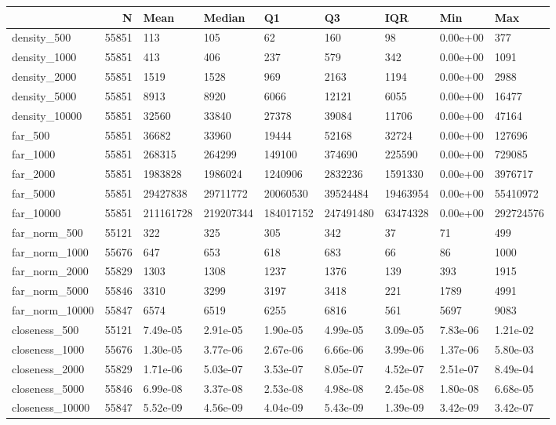 \begin{tabular}{lrlllllll}
\toprule
 & N & Mean & Median & Q1 & Q3 & IQR & Min & Max \\
\midrule
density\_500 & 55851 & 113 & 105 & 62 & 160 & 98 & 0.00e+00 & 377 \\
density\_1000 & 55851 & 413 & 406 & 237 & 579 & 342 & 0.00e+00 & 1091 \\
density\_2000 & 55851 & 1519 & 1528 & 969 & 2163 & 1194 & 0.00e+00 & 2988 \\
density\_5000 & 55851 & 8913 & 8920 & 6066 & 12121 & 6055 & 0.00e+00 & 16477 \\
density\_10000 & 55851 & 32560 & 33840 & 27378 & 39084 & 11706 & 0.00e+00 & 47164 \\
far\_500 & 55851 & 36682 & 33960 & 19444 & 52168 & 32724 & 0.00e+00 & 127696 \\
far\_1000 & 55851 & 268315 & 264299 & 149100 & 374690 & 225590 & 0.00e+00 & 729085 \\
far\_2000 & 55851 & 1983828 & 1986024 & 1240906 & 2832236 & 1591330 & 0.00e+00 & 3976717 \\
far\_5000 & 55851 & 29427838 & 29711772 & 20060530 & 39524484 & 19463954 & 0.00e+00 & 55410972 \\
far\_10000 & 55851 & 211161728 & 219207344 & 184017152 & 247491480 & 63474328 & 0.00e+00 & 292724576 \\
far\_norm\_500 & 55121 & 322 & 325 & 305 & 342 & 37 & 71 & 499 \\
far\_norm\_1000 & 55676 & 647 & 653 & 618 & 683 & 66 & 86 & 1000 \\
far\_norm\_2000 & 55829 & 1303 & 1308 & 1237 & 1376 & 139 & 393 & 1915 \\
far\_norm\_5000 & 55846 & 3310 & 3299 & 3197 & 3418 & 221 & 1789 & 4991 \\
far\_norm\_10000 & 55847 & 6574 & 6519 & 6255 & 6816 & 561 & 5697 & 9083 \\
closeness\_500 & 55121 & 7.49e-05 & 2.91e-05 & 1.90e-05 & 4.99e-05 & 3.09e-05 & 7.83e-06 & 1.21e-02 \\
closeness\_1000 & 55676 & 1.30e-05 & 3.77e-06 & 2.67e-06 & 6.66e-06 & 3.99e-06 & 1.37e-06 & 5.80e-03 \\
closeness\_2000 & 55829 & 1.71e-06 & 5.03e-07 & 3.53e-07 & 8.05e-07 & 4.52e-07 & 2.51e-07 & 8.49e-04 \\
closeness\_5000 & 55846 & 6.99e-08 & 3.37e-08 & 2.53e-08 & 4.98e-08 & 2.45e-08 & 1.80e-08 & 6.68e-05 \\
closeness\_10000 & 55847 & 5.52e-09 & 4.56e-09 & 4.04e-09 & 5.43e-09 & 1.39e-09 & 3.42e-09 & 3.42e-07 \\

\end{tabular}
